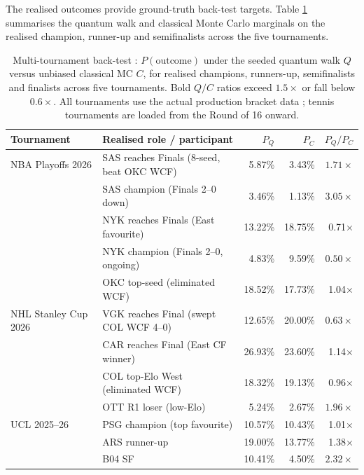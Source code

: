 \documentclass[11pt]{article}
\begin{document}
The realised outcomes provide ground-truth back-test targets. Table
\ref{tab:multi_tournament} summarises the quantum walk and classical
Monte Carlo marginals on the realised champion, runner-up and
semifinalists across the five tournaments.

\begin{table}[!htbp]
\centering
\caption{Multi-tournament back-test : $P(\text{outcome})$ under the
seeded quantum walk $Q$ versus unbiased classical MC $C$, for
realised champions, runners-up, semifinalists and finalists across
five tournaments. Bold $Q/C$ ratios exceed $1.5\times$ or fall below
$0.6\times$. All tournaments use the actual production bracket data ;
tennis tournaments are loaded from the Round of 16 onward.}
\label{tab:multi_tournament}
\small
\begin{tabular}{llrrr}
\toprule
Tournament & Realised role / participant & $P_Q$ & $P_C$ & $P_Q/P_C$ \\
\midrule
NBA Playoffs 2026 & SAS reaches Finals (8-seed, beat OKC WCF) & 5.87\% & 3.43\% & $\mathbf{1.71\times}$ \\
                  & SAS champion (Finals 2--0 down)            & 3.46\% & 1.13\% & $\mathbf{3.05\times}$ \\
                  & NYK reaches Finals (East favourite)        & 13.22\% & 18.75\% & 0.71$\times$ \\
                  & NYK champion (Finals 2--0, ongoing)        & 4.83\% & 9.59\% & $\mathbf{0.50\times}$ \\
                  & OKC top-seed (eliminated WCF)              & 18.52\% & 17.73\% & 1.04$\times$ \\
\midrule
NHL Stanley Cup 2026 & VGK reaches Final (swept COL WCF 4--0) & 12.65\% & 20.00\% & $\mathbf{0.63\times}$ \\
                     & CAR reaches Final (East CF winner) & 26.93\% & 23.60\% & 1.14$\times$ \\
                     & COL top-Elo West (eliminated WCF) & 18.32\% & 19.13\% & 0.96$\times$ \\
                     & OTT R1 loser (low-Elo) & 5.24\% & 2.67\% & $\mathbf{1.96\times}$ \\
\midrule
UCL 2025--26      & PSG champion (top favourite) & 10.57\% & 10.43\% & 1.01$\times$ \\
                  & ARS runner-up                 & 19.00\% & 13.77\% & 1.38$\times$ \\
                  & B04 SF                        & 10.41\% & 4.50\% & $\mathbf{2.32\times}$ \\

\end{tabular}
\end{table}
\end{document}
